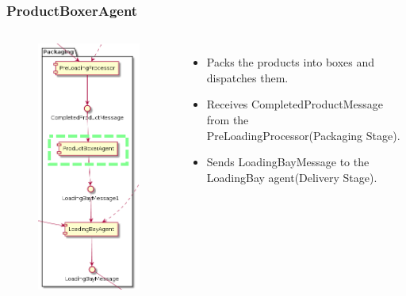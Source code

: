 \documentclass{beamer}
\begin{document}
\begin{frame}
    \frametitle{\huge{ProductBoxerAgent}}
    \begin{columns}[t]
        \begin{figure}[H]
            \centering
            \includegraphics[width=0.55\linewidth]{productboxer.png}
        \end{figure}
            \begin{itemize}
                \item Packs the products into boxes and dispatches them.
                \item Receives CompletedProductMessage from
the PreLoadingProcessor(Packaging Stage).
                \item Sends LoadingBayMessage to the LoadingBay agent(Delivery Stage).
            \end{itemize}
    \end{columns}
\end{frame}
\end{document}
